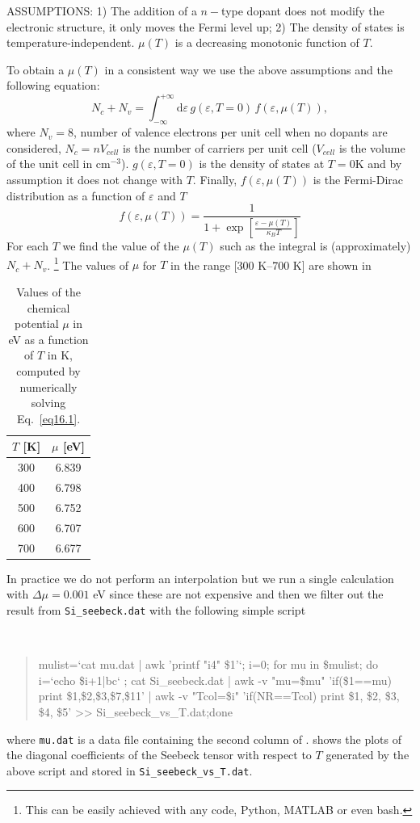\begin{itemize}
ASSUMPTIONS: 1) The addition of a $n-$type dopant does not modify the electronic structure, it only moves the Fermi level up; 2) The density of states is temperature-independent. $\mu(T)$ is a decreasing monotonic function of $T$.

To obtain a $\mu(T)$ in a consistent way we use the above assumptions and the following equation:
\begin{equation}
N_c + N_v = \int_{-\infty}^{+\infty}\! \mathrm{d}\varepsilon \, g(\varepsilon,T=0)\,f(\varepsilon,\mu(T)),\label{eq16.1}
\end{equation}
where $N_v=8$, number of valence electrons per unit cell when no dopants are considered, $N_c= nV_{cell}$ is the number of carriers per unit cell ($V_{cell}$ is the volume of the unit cell in cm$^{-3}$). $g(\varepsilon,T=0)$ is the density of states at $T=0$K and by assumption it does not change with $T$. Finally, $f(\varepsilon,\mu(T))$ is the Fermi-Dirac distribution as a function of $\varepsilon$ and $T$
\begin{equation}
f(\varepsilon,\mu(T)) = \frac{1}{1 + \exp[\frac{\varepsilon - \mu(T)}{\kappa_B T}]}
\end{equation}
For each $T$ we find the value of the $\mu(T)$ such as the integral is (approximately) $N_c + N_v$. %
\footnote{\footnotesize{This can be easily achieved with any code, \eg{} Python, MATLAB or even bash.}}
The values of $\mu$ for $T$ in the range [300 K--700 K] are shown in 
\begin{table}
\centering
\captionsetup{width=.5\textwidth}
\caption{Values of the chemical potential $\mu$ in eV as a function of $T$ in K, computed by numerically solving Eq.~\ref{eq16.1}.}
\begin{tabular}{@{} cc @{}}\toprule[1.5pt]
$T$ [K] & $\mu$ [eV] \\\midrule
300 & 6.839 \\
400 & 6.798 \\
500 & 6.752 \\
600 & 6.707 \\
700 & 6.677 \\\bottomrule[1pt]
\end{tabular}\label{tab16.1}
\end{table}

In practice we do not perform an interpolation but we run a single calculation with $\Delta \mu = 0.001$ eV since these are not expensive and then we filter out the result from {\tt Si\_seebeck.dat} with the following simple script
{\tt
\begin{quote}
mulist=`cat mu.dat | awk '{printf "i4" \$1}'`; i=0; for mu in \$mulist; do i=`echo \$i+1|bc` ; cat Si\_seebeck.dat | awk -v "mu=\$mu" '{if(\$1==mu) print \$1,\$2,\$3,\$7,\$11}' | awk -v "Tcol=\$i" '{if(NR==Tcol) print \$1, \$2, \$3, \$4, \$5}' >> Si\_seebeck\_vs\_T.dat;done
\end{quote}
}
where {\tt mu.dat} is a data file containing the second column of .  shows the plots of the diagonal coefficients of the Seebeck tensor with respect to $T$ generated by the above script and stored in {\tt Si\_seebeck\_vs\_T.dat}.


\end{itemize}
